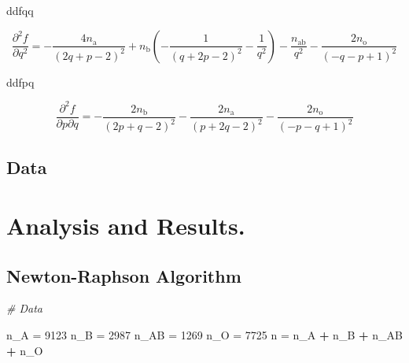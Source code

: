 \documentclass[]{article}
\newenvironment{Shaded}{\begin{snugshade}}{\end{snugshade}}
\newcommand{\DecValTok}[1]{\textcolor[rgb]{0.00,0.00,0.81}{#1}}
\newcommand{\StringTok}[1]{\textcolor[rgb]{0.31,0.60,0.02}{#1}}
\newcommand{\CommentTok}[1]{\textcolor[rgb]{0.56,0.35,0.01}{\textit{#1}}}
\newcommand{\OperatorTok}[1]{\textcolor[rgb]{0.81,0.36,0.00}{\textbf{#1}}}
\newcommand{\NormalTok}[1]{#1}
\begin{document}
ddfqq

\[ \frac{\partial^2 f}{\partial q^2} = -\dfrac{4n_\text{a}}{\left(2q+p-2\right)^2}+n_\text{b}\left(-\dfrac{1}{\left(q+2p-2\right)^2}-\dfrac{1}{q^2}\right)-\dfrac{n_\text{ab}}{q^2}-\dfrac{2n_\text{o}}{\left(-q-p+1\right)^2}
\]

ddfpq

\[\frac{\partial^2 f}{\partial p \partial q } =-\dfrac{2n_\text{b}}{\left(2p+q-2\right)^2}-\dfrac{2n_\text{a}}{\left(p+2q-2\right)^2}-\dfrac{2n_\text{o}}{\left(-p-q+1\right)^2}
\]

\subsection{Data}\label{data}

\section{Analysis and Results.}\label{analysis-and-results.}

\subsection{Newton-Raphson Algorithm}\label{newton-raphson-algorithm}

\begin{Shaded}
\begin{Highlighting}[]
\CommentTok{# Data}

\NormalTok{n_A =}\StringTok{ }\DecValTok{9123}
\NormalTok{n_B =}\StringTok{ }\DecValTok{2987}
\NormalTok{n_AB =}\StringTok{ }\DecValTok{1269}
\NormalTok{n_O =}\StringTok{ }\DecValTok{7725}
\NormalTok{n =}\StringTok{ }\NormalTok{n_A }\OperatorTok{+}\StringTok{ }\NormalTok{n_B }\OperatorTok{+}\StringTok{ }\NormalTok{n_AB }\OperatorTok{+}\StringTok{ }\NormalTok{n_O}
\end{Highlighting}
\end{Shaded}
\end{document}
